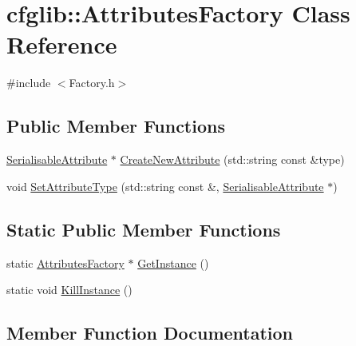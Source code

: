 \hypertarget{classcfglib_1_1AttributesFactory}{}\section{cfglib\+:\+:Attributes\+Factory Class Reference}
\label{classcfglib_1_1AttributesFactory}


{\ttfamily \#include $<$Factory.\+h$>$}

\subsection*{Public Member Functions}
\begin{DoxyCompactItemize}
\item 
\hyperlink{classcfglib_1_1SerialisableAttribute}{Serialisable\+Attribute} $\ast$ \hyperlink{classcfglib_1_1AttributesFactory_a28cadc5986575e1f99dee0611aadf46d}{Create\+New\+Attribute} (std\+::string const \&type)
\item 
void \hyperlink{classcfglib_1_1AttributesFactory_a409fa8a154e72a1041438c6e278bd502}{Set\+Attribute\+Type} (std\+::string const \&, \hyperlink{classcfglib_1_1SerialisableAttribute}{Serialisable\+Attribute} $\ast$)
\end{DoxyCompactItemize}
\subsection*{Static Public Member Functions}
\begin{DoxyCompactItemize}
\item 
static \hyperlink{classcfglib_1_1AttributesFactory}{Attributes\+Factory} $\ast$ \hyperlink{classcfglib_1_1AttributesFactory_a467b197e6a1dbbdcece13c93766a19ee}{Get\+Instance} ()
\item 
static void \hyperlink{classcfglib_1_1AttributesFactory_a3a1adf8be0c0115a191837d6c085c928}{Kill\+Instance} ()
\end{DoxyCompactItemize}


\subsection{Member Function Documentation}
\mbox{\label{classcfglib_1_1AttributesFactory_a28cadc5986575e1f99dee0611aadf46d}} 
